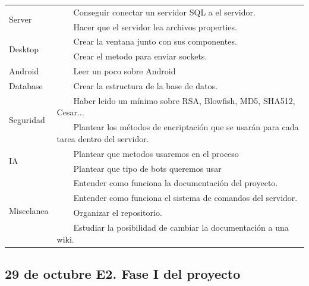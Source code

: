 \documentclass{article}
\newcommand{\tabitem}{~~\llap{\textbullet}~~}
\theoremstyle{definition}
\begin{document}
\begin{tabular}{|p{3cm}|p{11cm}|}
\hline
\multirow{2}{*}{Server} & \tabitem Conseguir conectar un servidor SQL a el servidor.\\
& \tabitem Hacer que el servidor lea archivos properties.\\
\hline
\multirow{2}{*}{Desktop} & \tabitem Crear la ventana junto con sus componentes.\\
& \tabitem Crear el metodo para enviar sockets. \\
\hline  
 Android & \tabitem Leer un poco sobre Android \\
\hline 
 Database & \tabitem  Crear la estructura de la base de datos. \\
 \hline 
 \multirow{2}{*}{Seguridad} & \tabitem Haber leido un mínimo sobre RSA, Blowfish, MD5, SHA512, Cesar... \\
 & \tabitem Plantear los métodos de encriptación que se usarán para cada tarea dentro del servidor.\\
 \hline 
 \multirow{2}{*}{IA} & \tabitem Plantear que metodos usaremos en el proceso \\
 &  \tabitem Plantear que tipo de bots queremos usar\\
 \hline 
 \multirow{4}{*}{Miscelanea} & \tabitem  Entender como funciona la documentación del proyecto. \\
 & \tabitem Entender como funciona el sistema de comandos del servidor. \\
 & \tabitem Organizar el repositorio.\\
 & \tabitem Estudiar la posibilidad de cambiar la documentación a una wiki.\\
\hline
\end{tabular}



\subsection{29 de octubre	E2. Fase I del proyecto}
\end{document}
